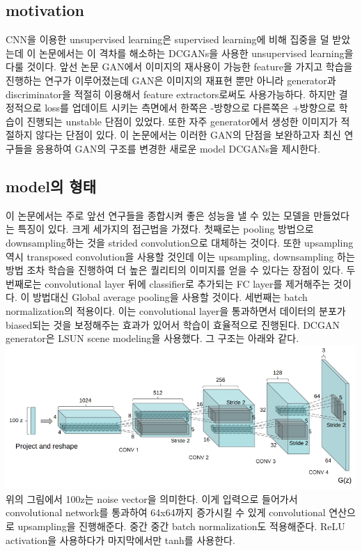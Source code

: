 \documentclass[extendedabs]{bmvc2k}
\begin{document}
 \subsection{motivation}
 \quad CNN을 이용한 unsupervised learning은 supervised learning에 비해 집중을 덜 받았는데 이 논문에서는
 이 격차를 해소하는 DCGANs을 사용한 unsupervised learning을 다룰 것이다. 앞선 논문 GAN에서 이미지의 재사용이 가능한 feature을 가지고 
 학습을 진행하는 연구가 이루어졌는데 GAN은 이미지의 재표현 뿐만 아니라 generator과 discriminator을 적절히 이용해서 feature extractors로써도 
 사용가능하다. 하지만 결정적으로 loss를 업데이트 시키는 측면에서 한쪽은 -방향으로 다른쪽은 +방향으로 학습이 진행되는 unstable 단점이 있었다.
 또한 자주 generator에서 생성한 이미지가 적절하지 않다는 단점이 있다. 이 논문에서는 이러한 GAN의 단점을 보완하고자 최신 연구들을 응용하여 GAN의 구조를 
 변경한 새로운 model DCGANs을 제시한다.

 \subsection{model의 형태\cite{youtube}}
 \quad 이 논문에서는 주로 앞선 연구들을 종합시켜 좋은 성능을 낼 수 있는 모델을 만들었다는 특징이 있다. 크게 세가지의 접근법을 가졌다.
 첫째로는 pooling 방법으로 downsampling하는 것을 strided convolution으로 대체하는 것이다. 또한 upsampling 역시 transposed convolution을 사용할 것인데
 이는 upsampling, downsampling 하는 방법 조차 학습을 진행하여 더 높은 퀄리티의 이미지를 얻을 수 있다는 장점이 있다. 두번째로는 convolutional layer 뒤에 classifier로 추가되는 FC layer를 제거해주는 것이다.
 이 방법대신 Global average pooling을 사용할 것이다. 세번째는 batch normalization의 적용이다. 이는 convolutional layer을 통과하면서 데이터의 분포가 biased되는 것을 보정해주는 효과가 있어서 
 학습이 효율적으로 진행된다. DCGAN generator은 LSUN scene modeling을 사용했다. 그 구조는 아래와 같다.
 \newline  \includegraphics[width=\linewidth]{images/00_DCGAN.PNG}
 위의 그림에서 100z는 noise vector을 의미한다. 이게 입력으로 들어가서 convolutional network를 통과하여 64x64까지 증가시킬 수 있게 convolutional 연산으로 upsampling을 진행해준다.
 중간 중간 batch normalization도 적용해준다. ReLU activation을 사용하다가 마지막에서만 tanh를 사용한다. 
\end{document}
